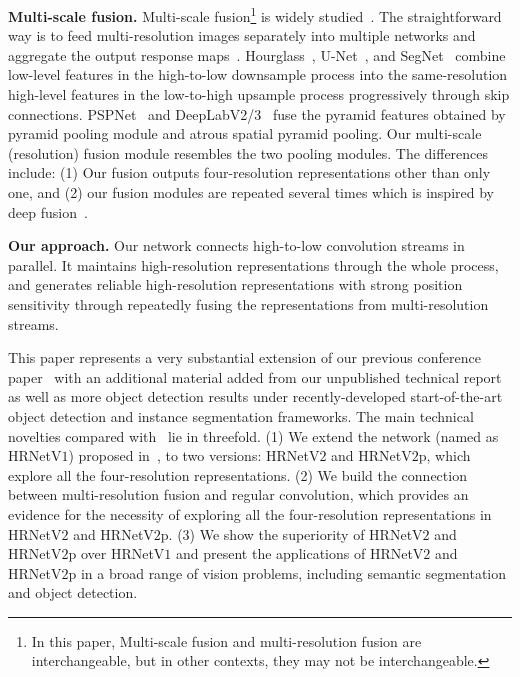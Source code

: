 \documentclass[10pt,journal,compsoc]{IEEEtran}
\begin{document}
\vspace{.1cm}
\noindent\textbf{Multi-scale fusion.}
Multi-scale fusion\footnote{In this paper,
Multi-scale fusion
and multi-resolution fusion are interchangeable,
but in other contexts, they may not be interchangeable.}
is widely studied~\cite{CaiFFV16, ChenPKMY18, ChenWPZYS17, FourureEFMT017, XieT15, ZhaoSQWJ17, KanazawaSJ14, XuXZYZ14, SamyAESE18, SaxenaV16, HuangCLWMW17, ZhouHZ15}.
The straightforward way is 
to feed multi-resolution images separately into 
multiple networks and aggregate the output response maps~\cite{TompsonGJLB15}.
Hourglass~\cite{NewellYD16}, U-Net~\cite{RonebergerFB15}, and SegNet~\cite{BadrinarayananK17} combine low-level features in the high-to-low downsample process into 
the same-resolution high-level features in 
the low-to-high upsample process progressively through skip connections.
PSPNet~\cite{ZhaoSQWJ17} and DeepLabV2/3~\cite{ChenPKMY18}
fuse the pyramid features obtained by pyramid pooling module and atrous spatial pyramid pooling.
Our multi-scale (resolution) fusion module resembles the two pooling modules.
The differences include: (1) Our fusion outputs four-resolution representations
other than only one,
and (2) our fusion modules are repeated several times
which is inspired by deep fusion~\cite{WangWZZ16, XieW0LHQ18, SunLLW18, ZhangQ0W17, ZhaoLMLZZTW18}.

\vspace{.1cm}
\noindent\textbf{Our approach.}
Our network connects high-to-low convolution streams in parallel.
It maintains high-resolution representations
through the whole process,
and generates reliable high-resolution representations
with strong position sensitivity
through repeatedly fusing the representations
from multi-resolution streams.

This paper represents a very substantial extension of our
previous conference paper~\cite{SunXLW19}
with an additional material added from our unpublished technical report~\cite{SunZJCXLMWLW19}
as well as more object detection results
under recently-developed start-of-the-art 
object detection and instance segmentation frameworks.
The main technical novelties compared with~\cite{SunXLW19} lie in threefold.
(1) We extend the network (named as HRNetV$1$) proposed in~\cite{SunXLW19},
to two versions: HRNetV$2$ and HRNetV$2$p,
which explore all the four-resolution representations.
(2) We build the connection between multi-resolution fusion
and regular convolution,
which provides an evidence for
the necessity of 
exploring all the four-resolution representations
in HRNetV$2$ and HRNetV$2$p.
(3) We show the superiority of
HRNetV$2$ and HRNetV$2$p 
over HRNetV$1$
and 
present the applications of
HRNetV$2$ and HRNetV$2$p 
in a broad range of vision problems, 
including semantic segmentation
and object detection.
\end{document}
